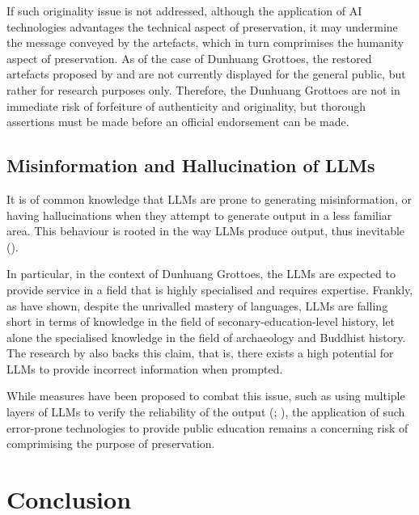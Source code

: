 If such originality issue is not addressed, although the application of AI technologies advantages the technical
aspect of preservation, it may undermine the message conveyed by the artefacts, which in turn comprimises the
humanity aspect of preservation. As of the case of Dunhuang Grottoes, the restored artefacts proposed by
 and  are not currently
displayed for the general public, but rather for research purposes only. Therefore, the Dunhuang Grottoes are
not in immediate risk of forfeiture of authenticity and originality, but thorough assertions must be made
before an official endorsement can be made.

\subsection{Misinformation and Hallucination of LLMs}

It is of common knowledge that LLMs are prone to generating misinformation, or having hallucinations when they
attempt to generate output in a less familiar area. This behaviour is rooted in the way LLMs produce output,
thus inevitable ().

In particular, in the context of Dunhuang Grottoes,
the LLMs are expected to provide service in a field that is highly specialised and requires expertise. Frankly,
as  have shown, despite the unrivalled mastery of languages,
LLMs are falling short in terms of knowledge in the field of seconary-education-level history, let alone the
specialised knowledge in the field of archaeology and Buddhist history. The research by
 also backs this claim, that is, there exists a high potential for LLMs
to provide incorrect information when prompted.

While measures have been proposed to combat this issue, such as using multiple layers of LLMs to verify the 
reliability of the output
(; ),
the application of such error-prone technologies to provide public education remains a concerning risk
of comprimising the purpose of preservation.

\section{Conclusion}

\printbibliography